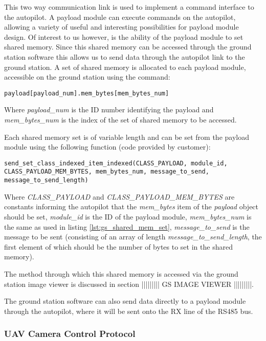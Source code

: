 This two way communication link is used to implement a command interface to 
the autopilot. A payload module can execute commands on the autopilot, 
allowing a variety of useful and interesting possibilities for payload
module design. Of interest to us however, is the ability of the payload
module to set shared memory. Since this shared memory can be accessed 
through the ground station software this allows us to send data through the
autopilot link to the ground station. A set of shared memory is allocated to 
each payload module, accessible on the ground station using the command:


\begin{lstlisting}[caption={Accessing shared memory from Ground Station}, label=lst:gs_shared_mem_set]
payload[payload_num].mem_bytes[mem_bytes_num]
\end{lstlisting}

Where \emph{payload\_num} is the ID number identifying the payload and 
\emph{mem\_bytes\_num} is the index of the set of shared memory to be accessed.

Each shared memory set is of variable length and can be set from the payload 
module using the following function (code provided by customer):

\begin{lstlisting}[caption={Setting shared memory from Payload}, label=lst:payload_shared_mem_set]
send_set_class_indexed_item_indexed(CLASS_PAYLOAD, module_id, 
CLASS_PAYLOAD_MEM_BYTES, mem_bytes_num, message_to_send,
message_to_send_length)
\end{lstlisting}

Where \emph{CLASS\_PAYLOAD} and \emph{CLASS\_PAYLOAD\_MEM\_BYTES} are constants 
informing the autopilot that the \emph{mem\_bytes} item of the \emph{payload} 
object should be set, \emph{module\_id} is the ID of the payload module,
\emph{mem\_bytes\_num} is the same as used in listing \ref{lst:gs_shared_mem_set},
\emph{message\_to\_send} is the message to be sent (consisting of an array of 
length \emph{message_to_send_length}, the first element of which should be 
the number of bytes to set in the shared memory).

The method through which this shared memory is accessed via the ground station
image viewer is discussed in section ||||||||| GS IMAGE VIEWER |||||||||.

The ground station software can also send data directly to a payload module 
through the autopilot, where it will be sent onto the RX line of the RS485
bus. 

\subsubsection{UAV Camera Control Protocol}